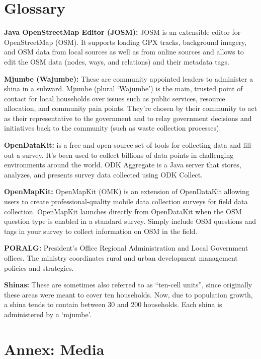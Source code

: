 \documentclass[a4paper,12pt,twoside]{article}
\begin{document}

\newpage
\section{Glossary}

\textbf{Java OpenStreetMap Editor (JOSM):} JOSM is an extensible editor for ​OpenStreetMap (OSM). It supports loading GPX tracks, background imagery, and OSM data from local sources as well as from online sources and allows to edit the OSM data (nodes, ways, and relations) and their metadata tags.


\textbf{Mjumbe (Wajumbe):} These are community appointed leaders to administer a shina in a subward. Mjumbe (plural ‘Wajumbe’) is the main, trusted point of contact for local households over issues such as public services, resource allocation, and community pain points. They’re chosen by their community to act as their representative to the government and to relay government decisions and initiatives back to the community (such as waste collection processes).


\textbf {OpenDataKit:} is a free and open-source set of tools for collecting data and fill out a  survey. It's been used to collect billions of data points in challenging environments around the world. ODK Aggregate is a Java server that stores, analyzes, and presents survey data collected using ODK Collect.


\textbf{OpenMapKit:} OpenMapKit (OMK) is an extension of OpenDataKit allowing users to create professional-quality mobile data collection surveys for field data collection. OpenMapKit launches directly from OpenDataKit when the OSM question type is enabled in a standard survey. Simply include OSM questions and tags in your survey to collect information on OSM in the field.


\textbf{PORALG:} President's Office Regional Administration and Local Government offices. The ministry coordinates rural and urban development management policies and strategies.


\textbf{Shinas:} These are sometimes also referred to as “ten-cell units”, since originally these areas were meant to cover ten households. Now, due to population growth, a shina tends to contain between 30 and 200 households. Each shina is administered by a ‘mjumbe’.

\newpage
\section{Annex: Media}


\end{document}
\end{multicols}
\end{document}

